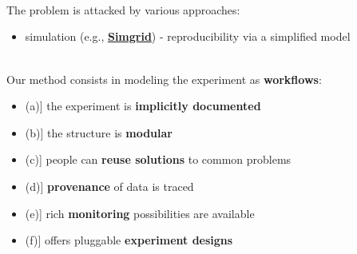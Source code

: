 \documentclass[xetex,final,10pt]{beamer}
\newcommand{\bigme}[2]{{\normalsize\raisebox{#1}{#2}}}
\newcommand{\fat}[1]{\textbf{#1}}
\begin{document}
\begin{frame}[fragile]
\begin{center}
    \begin{columns}[t]
        \begin{column}{0.48\textwidth}
            \begin{block}{\bigme{0em}{Unreproducible research}%
            \\[-1.1em]}


            \end{block}
            \odstep

\begin{block}{\bigme{-3pt}{Large-scale experiments}\\[-0.9em]}

\end{block}
\odstep

\newcommand{\solucja}[2]{%
    \href{#2}{\textbf{#1}}}

\begin{block}{\bigme{-3pt}{Existing solutions}\\[-0.9em]}
The problem is attacked by various approaches:

\begin{itemize}
    \item simulation (e.g.,
        \solucja{Simgrid}{http://simgrid.gforge.inria.fr/})
        - reproducibility via a simplified model
\end{itemize}
\end{block}
\odstep

\newcommand{\litera}[1]{\makebox[1em][c]{(#1)}}

\begin{block}{\bigme{-3pt}{Experimental workflow engine (XPFlow)}%
\\[-0.9em]}
Our method consists in modeling the experiment as \fat{workflows}:
\begin{itemize}
    \item[\litera{a}] the experiment is \fat{implicitly documented}
    \item[\litera{b}] the structure is \fat{modular}
    \item[\litera{c}] people can
        \fat{reuse solutions} to common problems
    \item[\litera{d}] \textbf{provenance} of data
        is traced
    \item[\litera{e}] rich \textbf{monitoring} possibilities
    are available
    \item[\litera{f}] offers pluggable \fat{experiment designs}
\end{itemize}


\end{block}
\end{column}
\end{columns}
\end{center}
\end{frame}
\end{document}
